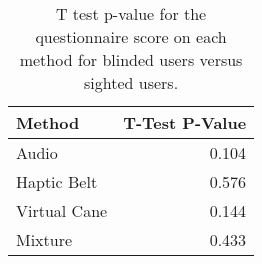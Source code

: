 
\begin{table}[!htb]
\centering
\caption{T test p-value for the questionnaire score on each method for blinded users versus sighted users.}
\label{tab:ttest_questionnaires}
\begin{tabular}{lr}
\toprule
      Method &  T-Test P-Value \\
\midrule
       Audio &           0.104 \\
 Haptic Belt &           0.576 \\
Virtual Cane &           0.144 \\
     Mixture &           0.433 \\
\bottomrule
\end{tabular}
\end{table}

